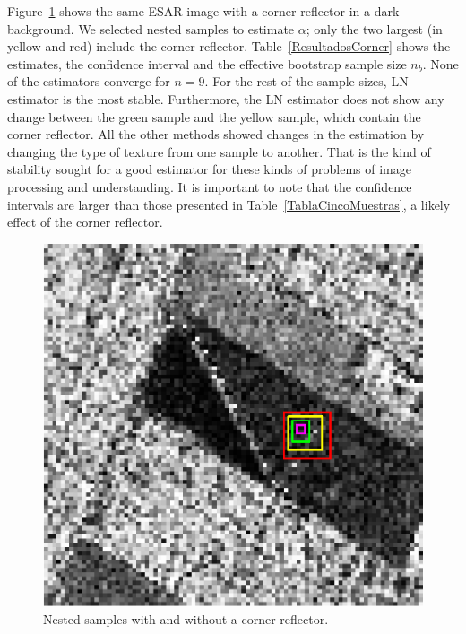 \documentclass[twocolumn]{svjour3}
\begin{document}
Figure~\ref{CornerReflector} shows the same ESAR image with a corner reflector in a dark background. 
We selected nested samples to estimate $\alpha$; only the two largest (in yellow and red) include the corner reflector.
Table~\ref{ResultadosCorner} shows the estimates, the confidence interval and the effective bootstrap sample size $n_b$.
None of the estimators converge for $n=9$. 
For the rest of the sample sizes, LN estimator is the most stable. 
Furthermore, the LN estimator does not show any change between the green sample and the yellow sample, which contain the corner reflector. 
All the other methods showed changes in the estimation by changing the type of texture from one sample to another. 
That is the kind of stability sought for a good estimator for these kinds of problems of image processing and understanding. 
It is important to note that the confidence intervals are larger than those presented in Table~\ref{TablaCincoMuestras}, a likely effect of the corner reflector.

\begin{figure}[hbt]
\centering
\includegraphics[width=\linewidth]{CornerJulia_Roja}
\caption{Nested samples with and without a corner reflector.}\label{CornerReflector}
\end{figure}
\end{document}
